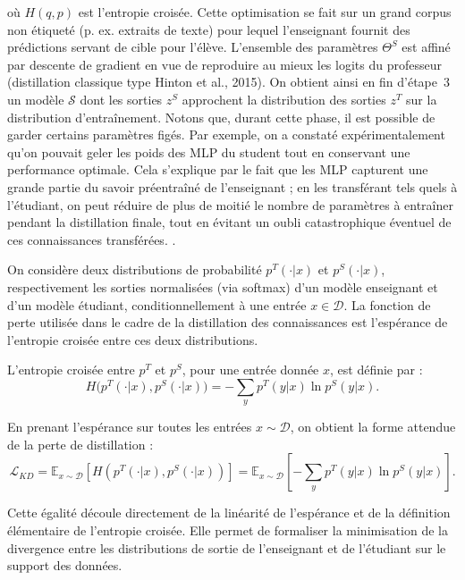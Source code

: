 où $H(q,p)$ est l’entropie croisée. Cette optimisation se fait sur un grand corpus non étiqueté (p. ex. extraits de texte) pour lequel l'enseignant fournit des prédictions servant de cible pour l’élève. L’ensemble des paramètres $\Theta^S$ est affiné par descente de gradient en vue de reproduire au mieux les logits du professeur (distillation classique type Hinton et al., 2015). On obtient ainsi en fin d’étape 3 un modèle $\mathcal{S}$ dont les sorties $z^S$ approchent la distribution des sorties $z^T$ sur la distribution d’entraînement. Notons que, durant cette phase, il est possible de garder certains paramètres figés. Par exemple, on a constaté expérimentalement qu’on pouvait geler les poids des MLP du student tout en conservant une performance optimale. Cela s’explique par le fait que les MLP capturent une grande partie du savoir préentraîné de l'enseignant ; en les transférant tels quels à l’étudiant, on peut réduire de plus de moitié le nombre de paramètres à entraîner pendant la distillation finale, tout en évitant un oubli catastrophique éventuel de ces connaissances transférées.
.

\begin{demonstration}
On considère deux distributions de probabilité \(p^T(\cdot|x)\) et \(p^S(\cdot|x)\), respectivement les sorties normalisées (via softmax) d’un modèle enseignant et d’un modèle étudiant, conditionnellement à une entrée \(x \in \mathcal{D}\). La fonction de perte utilisée dans le cadre de la distillation des connaissances est l'espérance de l'entropie croisée entre ces deux distributions.

L'entropie croisée entre \(p^T\) et \(p^S\), pour une entrée donnée \(x\), est définie par :
\[
H\big(p^T(\cdot|x), p^S(\cdot|x)\big) = - \sum_{y} p^T(y|x) \ln p^S(y|x).
\]

En prenant l’espérance sur toutes les entrées \(x \sim \mathcal{D}\), on obtient la forme attendue de la perte de distillation :
\[
\mathcal{L}_{KD} = \mathbb{E}_{x \sim \mathcal{D}} \left[ H\left(p^T(\cdot|x), p^S(\cdot|x)\right) \right] = \mathbb{E}_{x \sim \mathcal{D}} \left[ - \sum_{y} p^T(y|x) \ln p^S(y|x) \right].
\]

Cette égalité découle directement de la linéarité de l'espérance et de la définition élémentaire de l'entropie croisée. Elle permet de formaliser la minimisation de la divergence entre les distributions de sortie de l’enseignant et de l’étudiant sur le support des données.
\end{demonstration}

